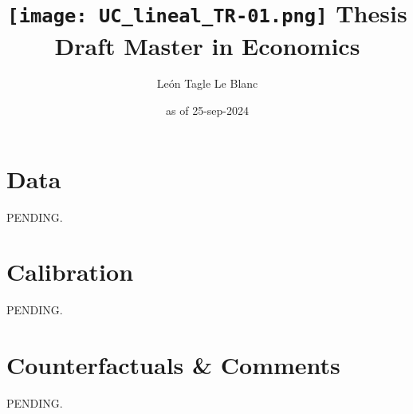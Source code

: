 \documentclass[11pt]{article}
\title{\texttt{[image: UC\_lineal\_TR-01.png]} \linebreak \linebreak 
Thesis Draft \linebreak Master in Economics}
\author{León Tagle Le Blanc}
\date{as of 25-sep-2024}
\begin{document}
\begin{titlepage}
\maketitle
\tableofcontents
\setcounter{page}{0}
\thispagestyle{empty}
\end{titlepage}






\section{Data}

PENDING.



\section{Calibration}

PENDING.

\section{Counterfactuals \& Comments}

PENDING.

\newpage

	 


\newpage


\end{document}
